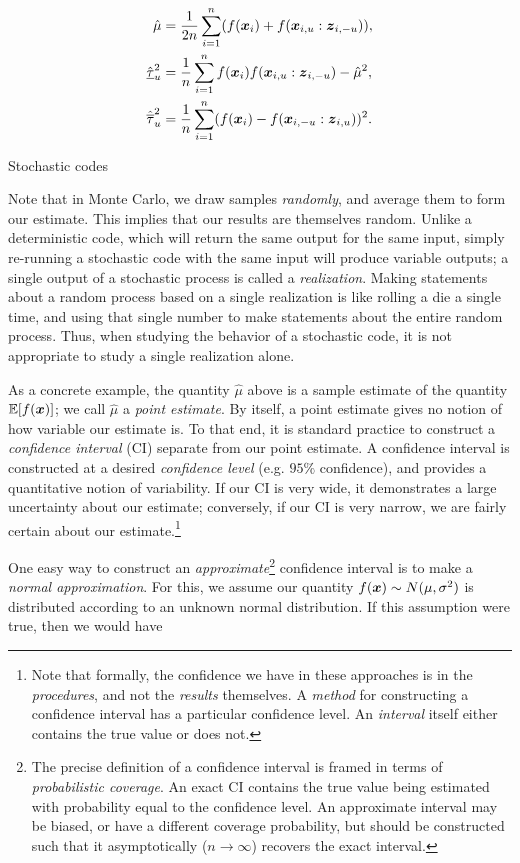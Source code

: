 \documentclass[../primer.tex]{subfiles}
\begin{document}
\begin{equation}\begin{aligned}
  \hat{\mu} &= \frac{1}{2n}\sum_{i=1}^n(f(\boldsymbol{x}_i)+f(\boldsymbol{x}_{i,u}:\boldsymbol{z}_{i,-u})), \\
  \hat{\underline{\tau}}_u^2 &= \frac{1}{n}\sum_{i=1}^n f(\boldsymbol{x}_i)f(\boldsymbol{x}_{i,u}:\boldsymbol{z}_{i,-u})-\hat{\mu}^2, \\
  \hat{\overline{\tau}}_u^2 &= \frac{1}{n}\sum_{i=1}^n(f(\boldsymbol{x}_i)-f(\boldsymbol{x}_{i,-u}:\boldsymbol{z}_{i,u}))^2.
\end{aligned}\end{equation}

Stochastic codes

Note that in Monte Carlo, we draw samples \emph{randomly}, and average them to form
our estimate. This implies that our results are themselves random. Unlike a
deterministic code, which will return the same output for the same input, simply
re-running a stochastic code with the same input will produce variable outputs;
a single output of a stochastic process is called a \emph{realization}. Making
statements about a random process based on a single realization is like rolling
a die a single time, and using that single number to make statements about the
entire random process. Thus, when studying the behavior of a stochastic code, it
is not appropriate to study a single realization alone.

As a concrete example, the quantity \(\hat{\mu}\) above is a sample estimate of
the quantity \(\mathbb{E}[f(\boldsymbol{x})]\); we call \(\hat{\mu}\) a \emph{point estimate}. By itself, a
point estimate gives no notion of how variable our estimate is. To that end, it
is standard practice to construct a \emph{confidence interval} (CI) separate from our
point estimate. A confidence interval is constructed at a desired \emph{confidence
level} (e.g. \(95\%\) confidence), and provides a quantitative notion of
variability. If our CI is very wide, it demonstrates a large uncertainty about
our estimate; conversely, if our CI is very narrow, we are fairly certain about
our estimate.\footnote{Note that formally, the confidence we have in these approaches
is in the \emph{procedures}, and not the \emph{results} themselves. A \emph{method} for
constructing a confidence interval has a particular confidence level. An
\emph{interval} itself either contains the true value or does not.}

One easy way to construct an \emph{approximate}\footnote{The precise definition of a
confidence interval is framed in terms of \emph{probabilistic coverage}. An
exact CI contains the true value being estimated with probability equal to the
confidence level. An approximate interval may be biased, or have a different
coverage probability, but should be constructed such that it asymptotically
(\(n\to\infty\)) recovers the exact interval.} confidence interval is to make a
\emph{normal approximation}. For this, we assume our quantity \(f(\boldsymbol{x})\sim
N(\mu,\sigma^2)\) is distributed according to an unknown normal distribution. If
this assumption were true, then we would have
\end{document}
